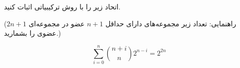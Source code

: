 \EXERCISE
اتحاد زیر را با روش ترکیبیاتی اثبات کنید.

(راهنمایی: تعداد زیر مجموعه‌های دارای حداقل
$n + 1$
عضو در مجموعه‌ای
$2n + 1$
عضوی را بشمارید.)

$$\sum_{i=0}^{n}\binom{n+i}{n} 2^{n-i} = 2^{2n}$$